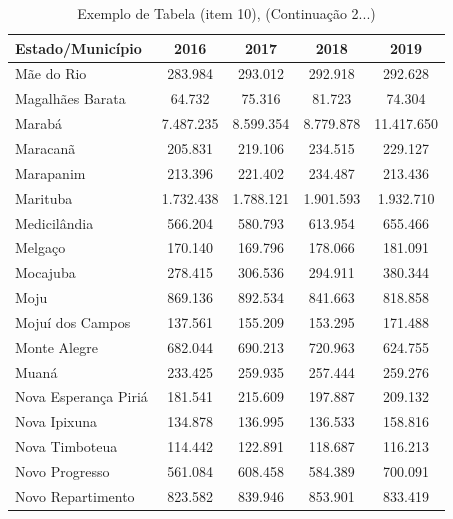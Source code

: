 \newpage
\begin{table}[H]
    \centering
    {
    \caption{Exemplo de Tabela (item 10), (Continuação 2...)}  
    \label{item 10 regras3}
    \vspace{0.1cm}
\begin{tabular}{l|c|c|c|c}
  \hline\hline
  Estado/Município        &    2016    &    2017    &  2018      &  2019    \\
  \hline\hline
   Mãe do Rio             &  283.984   &  293.012   &  292.918   & 292.628   \\
   Magalhães Barata       &  64.732    &  75.316    &  81.723    & 74.304    \\
   Marabá                 &  7.487.235 &  8.599.354 &  8.779.878 & 11.417.650 \\
   Maracanã               & 205.831    &  219.106   &  234.515   & 229.127    \\ 
   Marapanim              & 213.396    &  221.402   &  234.487   & 213.436    \\
   Marituba               & 1.732.438  & 1.788.121  &  1.901.593 &  1.932.710  \\
   Medicilândia           & 566.204    & 580.793    &  613.954   &  655.466    \\
   Melgaço                & 170.140    & 169.796    &  178.066   &  181.091     \\
   Mocajuba               & 278.415    & 306.536    &  294.911   &   380.344     \\
   Moju                   & 869.136    & 892.534    & 841.663    & 818.858      \\
   Mojuí dos Campos       & 137.561    & 155.209    & 153.295    & 171.488      \\
   Monte Alegre           & 682.044    & 690.213    & 720.963    & 624.755      \\
   Muaná                  & 233.425    &  259.935   & 257.444    &  259.276     \\
   Nova Esperança Piriá   & 181.541    &  215.609   & 197.887    &  209.132     \\
   Nova Ipixuna           & 134.878    &  136.995   & 136.533    &  158.816    \\
   Nova Timboteua         & 114.442    &  122.891   & 118.687    & 116.213     \\
   Novo Progresso         & 561.084    &  608.458   & 584.389    & 700.091      \\
   Novo Repartimento      &  823.582   &  839.946   & 853.901    & 833.419      \\

\end{tabular}}
\end{table}
